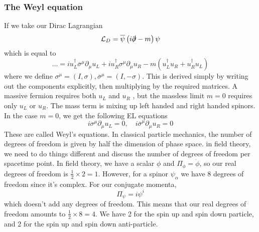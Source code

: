 \subsubsection{The Weyl equation} 
If we take our Dirac Lagrangian 
\[
	\mathcal{L}_D  = \overline{\psi} \left(i\slashed{\partial} - m\right)\psi 
\] which is equal to 
\[
	\dots = i u_L ^ \dagger \overline{\sigma} ^ \mu \partial  _ \mu u _ L + 
 i u _ R ^ \dagger  \sigma ^ \mu \partial  _ \mu u _{ R } - m \left(  
 u _ L ^ \dagger u _ R + u _ R ^ \dagger u _ L \right) 
\] where we define $ \sigma ^ \mu = ( I , \sigma ) , \overline{\sigma } ^ \mu = ( I , - \sigma ) $.
This is derived simply by writing out 
the components explicitly, then multiplying
by the required matrices. 
A massive fermion requires both $ u _L $ and $ u _ R $ , but 
the massless limit $ m =0 $ requires only $ u _ L $ or $ u _ R $. 
The mass term is mixing up left handed and right handed spinors. 
In the case  $ m = 0$, we get the following EL equations
\[
 i \sigma ^ \mu \partial  _ \mu u _ L = 0 , \quad i \overline{ \sigma } ^ \mu \partial  _ \mu u _ R  = 0 
\] These are called Weyl's equations. 
In classical particle mechanics, the number of degrees of freedom is given by 
half the dimension of phase space. in field theory, we need to do things different
and discuss the number of degrees of freedom per spacetime point. 
In field theory, we have a scalar $ \phi $ and $ \Pi_{ \phi } = \dot { \phi } $, so our 
real degrees of freedom is $ \frac{1}{2 } \times 2  = 1$. 
However, for a spinor $ \psi _{ \alpha } $ we have 8 degrees of freedom since 
it's complex. For our conjugate momenta, 
\[
 \Pi _{ \psi } = i \psi ^{ i } 
\] which doesn't add any degrees of freedom. This means 
that our real degrees of freedom amounts to $\frac{1}{2 } \times 8  = 4$. 
We have 2 for the spin up and spin down particle, and 2 for the 
spin up and spin down anti-particle.

